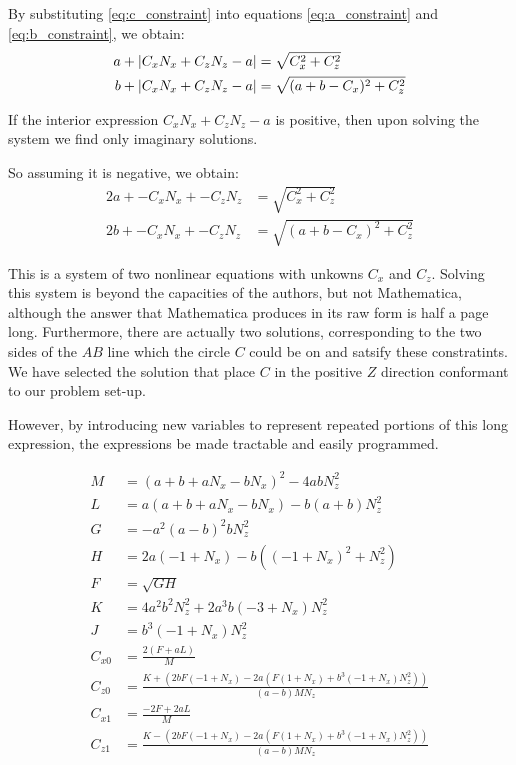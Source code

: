 \documentclass{article}
\begin{document}
By substituting \ref{eq:c_constraint} into equations
\ref{eq:a_constraint} and \ref{eq:b_constraint},
we obtain:
\begin{align}
  a + \left\lvert C_x N_x + C_z N_z - a\right\rvert &= \sqrt{C_x^2 + C_z^2} \\
  b + \left\lvert C_x N_x + C_z N_z - a\right\rvert &= \sqrt{(a+b-C_x)^2 + C_z^2}
\end{align}

If the interior expression $C_x N_x + C_z N_z - a$ is positive,
then upon solving the system we find only imaginary solutions.

So assuming it is negative, we obtain:
\begin{align}
  2a + -C_x N_x + -C_z N_z  &= \sqrt{C_x^2 + C_z ^2} \\
  2b + -C_x N_x + -C_z N_z  &= \sqrt{(a+b-C_x)^2 + C_z^2}
\end{align}



This is a system of two nonlinear equations with unkowns $C_x$ and $C_z$.
Solving this system is beyond the capacities of the authors,
but not Mathematica, although the answer that Mathematica produces
in its raw form is half a page long.
Furthermore, there are actually two solutions, corresponding
to the two sides of the $AB$ line which the circle $C$ could be
on and satsify these constratints.
We have selected the solution that place $C$ in the positive $Z$
direction conformant to our problem set-up.

However, by introducing new variables to represent repeated
portions of this long expression, the expressions be
made tractable and easily programmed.

\begin{align}
M &= (a + b + a N_x - b N_x)^2 - 4 a b N_z^2 \\
L &= a (a + b + a N_x - b N_x) - b (a + b) N_z^2 \\
G &= -a^2 (a - b)^2 b N_z^2 \\
H &= 2 a (-1 + N_x) - b ((-1 + N_x)^2 + N_z^2) \\
F &= \sqrt{G H} \\
K &= 4 a^2 b^2 N_z^2 + 2 a^3 b (-3 + N_x) N_z^2 \\
J &= b^3 (-1 + N_x) N_z^2 \\
C_{x0} &= \frac{2 (F + a L)}{M} \\
C_{z0} &= \frac{K + (2 b F (-1 + N_x) -
  2 a (F (1 + N_x) + b^3 (-1 + N_x) N_z^2))}
{(a -  b) M N_z} \\
C_{x1} &= \frac{-2 F + 2 a L}{M} \\
  C_{z1} &= \frac{K - (2 b F (-1 + N_x) -
  2 a (F (1 + N_x) + b^3 (-1 + N_x) N_z^2))}
  {(a - b) M N_z}
\end{align}
\end{document}
